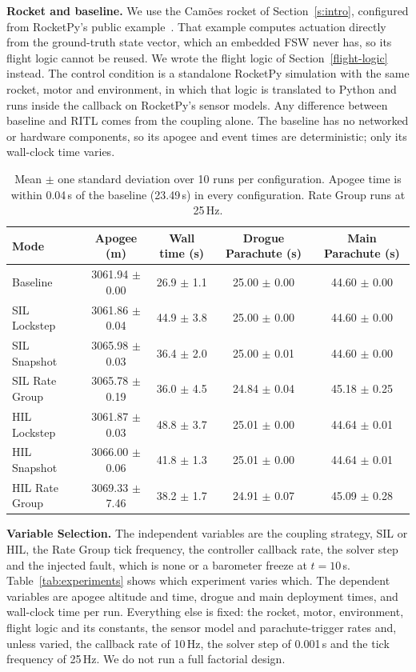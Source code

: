 \textbf{Rocket and baseline.} We use the Camões rocket of Section~\ref{s:intro}, configured from RocketPy's public example~\cite{rocketpy_camoes}. That example computes actuation directly from the ground-truth state vector, which an embedded FSW never has, so its flight logic cannot be reused. We wrote the flight logic of Section~\ref{flight-logic} instead. The control condition is a standalone RocketPy simulation with the same rocket, motor and environment, in which that logic is translated to Python and runs inside the callback on RocketPy's sensor models. Any difference between baseline and RITL comes from the coupling alone. The baseline has no networked or hardware components, so its apogee and event times are deterministic; only its wall-clock time varies.

\begin{table}[t]
\centering
\caption{Mean $\pm$ one standard deviation over 10 runs per configuration. Apogee time is within 0.04\,s of the baseline (23.49\,s) in every configuration. Rate Group runs at 25\,Hz.}
\label{tab:summary}
\small
\begin{tabular}{lcccc}
\toprule
\textbf{Mode} & \textbf{Apogee (m)} & \textbf{Wall time (s)} & \textbf{Drogue Parachute (s)} & \textbf{Main Parachute (s)} \\
\midrule
Baseline & 3061.94 $\pm$ 0.00 & 26.9 $\pm$ 1.1 & 25.00 $\pm$ 0.00 & 44.60 $\pm$ 0.00 \\
\midrule
SIL Lockstep   & 3061.86 $\pm$ 0.04 & 44.9 $\pm$ 3.8 & 25.00 $\pm$ 0.00 & 44.60 $\pm$ 0.00 \\
SIL Snapshot   & 3065.98 $\pm$ 0.03 & 36.4 $\pm$ 2.0 & 25.00 $\pm$ 0.01 & 44.60 $\pm$ 0.00 \\
SIL Rate Group & 3065.78 $\pm$ 0.19 & 36.0 $\pm$ 4.5 & 24.84 $\pm$ 0.04 & 45.18 $\pm$ 0.25 \\
\midrule
HIL Lockstep   & 3061.87 $\pm$ 0.03 & 48.8 $\pm$ 3.7 & 25.01 $\pm$ 0.00 & 44.64 $\pm$ 0.01 \\
HIL Snapshot   & 3066.00 $\pm$ 0.06 & 41.8 $\pm$ 1.3 & 25.01 $\pm$ 0.00 & 44.64 $\pm$ 0.01 \\
HIL Rate Group & 3069.33 $\pm$ 7.46 & 38.2 $\pm$ 1.7 & 24.91 $\pm$ 0.07 & 45.09 $\pm$ 0.28 \\
\bottomrule
\end{tabular}
\end{table}

\textbf{Variable Selection.} The independent variables are the coupling strategy, SIL or HIL, the Rate Group tick frequency, the controller callback rate, the solver step and the injected fault, which is none or a barometer freeze at $t=10$\,s. Table~\ref{tab:experiments} shows which experiment varies which. The dependent variables are apogee altitude and time, drogue and main deployment times, and wall-clock time per run. Everything else is fixed: the rocket, motor, environment, flight logic and its constants, the sensor model and parachute-trigger rates and, unless varied, the callback rate of 10\,Hz, the solver step of 0.001\,s and the tick frequency of 25\,Hz. We do not run a full factorial design.

